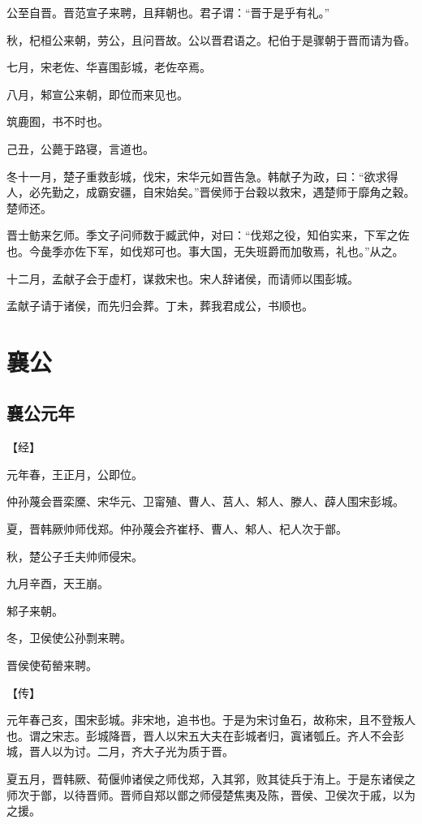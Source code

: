 \documentclass[a4paper,12pt,UTF8,twoside]{ctexbook}
\begin{document}
公至自晋。晋范宣子来聘，且拜朝也。君子谓：“晋于是乎有礼。”

秋，杞桓公来朝，劳公，且问晋故。公以晋君语之。杞伯于是骤朝于晋而请为昏。

七月，宋老佐、华喜围彭城，老佐卒焉。

八月，邾宣公来朝，即位而来见也。

筑鹿囿，书不时也。

己丑，公薨于路寝，言道也。

冬十一月，楚子重救彭城，伐宋，宋华元如晋告急。韩献子为政，曰：“欲求得人，必先勤之，成霸安疆，自宋始矣。”晋侯师于台穀以救宋，遇楚师于靡角之穀。楚师还。

晋士鲂来乞师。季文子问师数于臧武仲，对曰：“伐郑之役，知伯实来，下军之佐也。今彘季亦佐下军，如伐郑可也。事大国，无失班爵而加敬焉，礼也。”从之。

十二月，孟献子会于虚朾，谋救宋也。宋人辞诸侯，而请师以围彭城。

孟献子请于诸侯，而先归会葬。丁未，葬我君成公，书顺也。


\chapter{襄公}

\section{襄公元年}



【经】

元年春，王正月，公即位。

仲孙蔑会晋栾黡、宋华元、卫甯殖、曹人、莒人、邾人、滕人、薜人围宋彭城。

夏，晋韩厥帅师伐郑。仲孙蔑会齐崔杼、曹人、邾人、杞人次于鄫。

秋，楚公子壬夫帅师侵宋。

九月辛酉，天王崩。

邾子来朝。

冬，卫侯使公孙剽来聘。

晋侯使荀罃来聘。

【传】

元年春己亥，围宋彭城。非宋地，追书也。于是为宋讨鱼石，故称宋，且不登叛人也。谓之宋志。彭城降晋，晋人以宋五大夫在彭城者归，寘诸瓠丘。齐人不会彭城，晋人以为讨。二月，齐大子光为质于晋。

夏五月，晋韩厥、荀偃帅诸侯之师伐郑，入其郛，败其徒兵于洧上。于是东诸侯之师次于鄫，以待晋师。晋师自郑以鄫之师侵楚焦夷及陈，晋侯、卫侯次于戚，以为之援。
\end{document}

